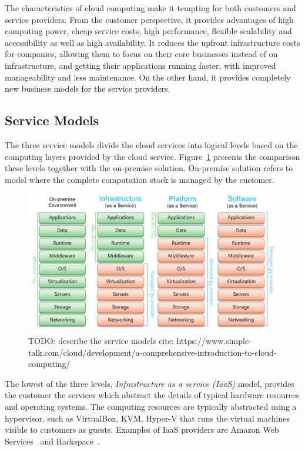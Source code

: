 The characteristics of cloud computing make it tempting for both customers and service providers. From the customer perspective, it provides advantages of high computing power, cheap service costs, high performance, flexible scalability and accessibility as well as high availability. It reduces the upfront infrastructure costs for companies, allowing them to focus on their core businesses instead of on infrastructure, and getting their applications running faster, with improved manageability and less maintenance. On the other hand, it provides completely new business models for the service providers.~\cite{Mell:2011:ccdef, Dikaiakos:2009:Cloud}

\subsection{Service Models}
The three service models divide the cloud services into logical levels based on the computing layers provided by the cloud service. Figure~\ref{fig:cloud-computing-service-models} presents the comparison these levels together with the on-premise solution. On-premise solution refers to model where the complete computation stack is managed by the customer.

\begin{figure}[]
  \begin{center}
    \includegraphics[width=\textwidth]{images/cloud-computing-service-models.png}
    \caption{TODO: describe the service models cite: https://www.simple-talk.com/cloud/development/a-comprehensive-introduction-to-cloud-computing/}
    \label{fig:cloud-computing-service-models}
  \end{center}
\end{figure}

The lowest of the three levels, \emph{Infrastructure as a service (IaaS)} model, provides the customer the services which abstract the details of typical hardware resources and operating systems. The computing resources are typically abstracted using a hypervisor, such as VirtualBox, KVM, Hyper-V that runs the virtual machines visible to customers as guests. Examples of IaaS providers are Amazon Web Services~\cite{Murty:2008:AWS} and Rackspace~\cite{Rackspace:2010:Inc}.~\cite{Mell:2011:ccdef}

